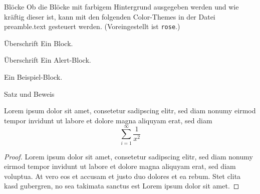 \begin{frame}[fragile]{Blöcke}
Ob die Blöcke mit farbigem Hintergrund ausgegeben werden und wie kräftig
dieser ist, kann mit den folgenden Color-Themes in der Datei preamble.text 
gesteuert werden. (Voreingestellt ist \texttt{rose}.)

  \begin{block}{Überschrift}
    Ein Block.
  \end{block}
  \begin{alertblock}{Überschrift}
    Ein Alert-Block.
  \end{alertblock}
  \begin{example}
    Ein Beispiel-Block.
  \end{example}
\end{frame}

\begin{frame}{Satz und Beweis}
  \begin{theorem}%
    Lorem ipsum dolor sit amet, consetetur sadipscing elitr, sed diam nonumy
    eirmod tempor invidunt ut labore et dolore magna aliquyam erat, sed diam
    \begin{equation}
      \label{eq:Satz}
      \sum_{i=1}^{\infty}\frac{1}{x^2}
    \end{equation}
  \end{theorem}
  \begin{proof}%
    Lorem ipsum dolor sit amet, consetetur sadipscing elitr, sed diam nonumy
    eirmod tempor invidunt ut labore et dolore magna aliquyam erat, sed diam
    voluptua. At vero eos et accusam et justo duo dolores et ea rebum. Stet
    clita kasd gubergren, no sea takimata sanctus est Lorem ipsum dolor sit
    amet. 
  \end{proof}
\end{frame}

